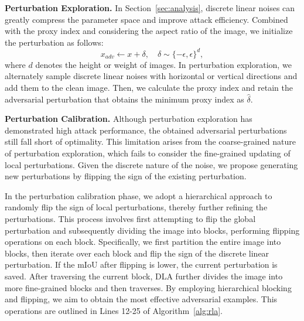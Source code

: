 \documentclass[10pt,twocolumn,letterpaper]{article}
\begin{document}
\textbf{Perturbation Exploration.} In Section~\ref{sec:analysis}, discrete linear noises can greatly compress the parameter space and improve attack efficiency. Combined with the proxy index and considering the aspect ratio of the image, we initialize the perturbation as follows:
\begin{equation}
    x_{adv} \leftarrow x+\delta,\quad\delta \sim \{-\epsilon, \epsilon\}^d,
\end{equation}
where $d$ denotes the height or weight of images. In perturbation exploration, we alternately sample discrete linear noises with horizontal or vertical directions and add them to the clean image. Then, we calculate the proxy index and retain the adversarial perturbation that obtains the minimum proxy index as $\hat \delta$.

\textbf{Perturbation Calibration.}
Although perturbation exploration has demonstrated high attack performance, the obtained adversarial perturbations still fall short of optimality. This limitation arises from the coarse-grained nature of perturbation exploration, which fails to consider the fine-grained updating of local perturbations. Given the discrete nature of the noise, we propose generating new perturbations by flipping the sign of the existing perturbation.

In the perturbation calibration phase, we adopt a hierarchical approach to randomly flip the sign of local perturbations, thereby further refining the perturbations. This process involves first attempting to flip the global perturbation and subsequently dividing the image into blocks, performing flipping operations on each block. Specifically, we first partition the entire image into blocks, then iterate over each block and flip the sign of the discrete linear perturbation. If the mIoU after flipping is lower, the current perturbation is saved. After traversing the current block, DLA further divides the image into more fine-grained blocks and then traverses. By employing hierarchical blocking and flipping, we aim to obtain the most effective adversarial examples. This operations are outlined in Lines 12-25 of Algorithm~\ref{alg:rla}.
\end{document}

